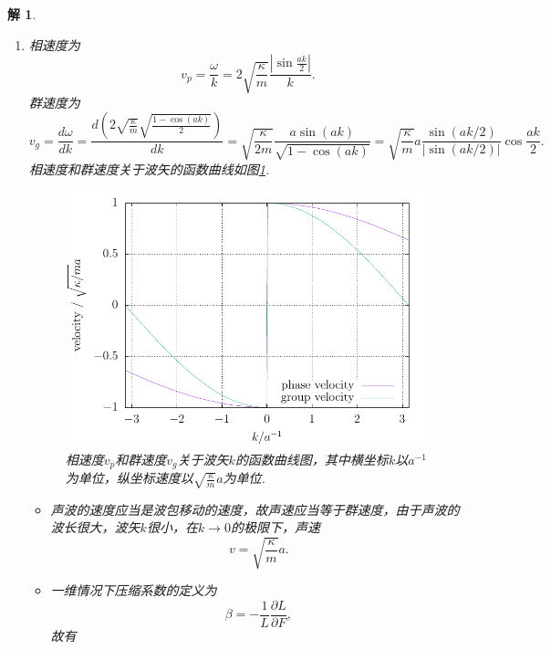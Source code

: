 \documentclass[UTF8,10pt,a4paper]{article}
\theoremstyle{Problem}
\theoremstyle{Solution}
\newtheorem*{sol}{解}
\providecommand{\abs}[1]{\left\lvert#1\right\rvert}
\begin{document}
\begin{sol}
\begin{enumerate}
\begin{itemize}
            \begin{equation}
                \lambda=\frac{2\pi}{k}\leq a,
            \end{equation}
            故不同的正则模式有$N$种.
        \end{itemize}
        \item[(d)] 相速度为
        \begin{equation}
            v_p=\frac{\omega}{k}=2\sqrt{\frac{\kappa}{m}}\frac{\abs{\sin\frac{ak}{2}}}{k}.
        \end{equation}
        群速度为
        \begin{equation}
            v_g=\frac{d\omega}{dk}=\frac{d\left(2\sqrt{\frac{\kappa}{m}}\sqrt{\frac{1-\cos(ak)}{2}}\right)}{dk}=\sqrt{\frac{\kappa}{2m}}\frac{a\sin(ak)}{\sqrt{1-\cos(ak)}}=\sqrt{\frac{\kappa}{m}}a\frac{\sin(ak/2)}{\abs{\sin(ak/2)}}\cos\frac{ak}{2}.
        \end{equation}
        相速度和群速度关于波矢的函数曲线如图\ref{3-v-k}.
        \begin{figure}[h]
            \centering
            \includegraphics[width=.4\textwidth]{3-v-k.pdf}
            \caption{相速度$v_p$和群速度$v_g$关于波矢$k$的函数曲线图，其中横坐标$k$以$a^{-1}$为单位，纵坐标速度以$\sqrt{\frac{\kappa}{m}}a$为单位.}
            \label{3-v-k}
        \end{figure}
        \begin{itemize}
            \item[$\triangleright$] 声波的速度应当是波包移动的速度，故声速应当等于群速度，由于声波的波长很大，波矢$k$很小，在$k\rightarrow 0$的极限下，声速
            \begin{equation}
                \label{3-sound-velocity}
                v=\sqrt{\frac{\kappa}{m}}a.
            \end{equation}
            \item[$\triangleright$] 一维情况下压缩系数的定义为
            \begin{equation}
                \beta=-\frac{1}{L}\frac{\partial L}{\partial F},
            \end{equation}
            故有

\end{itemize}
\end{enumerate}
\end{sol}
\end{document}
